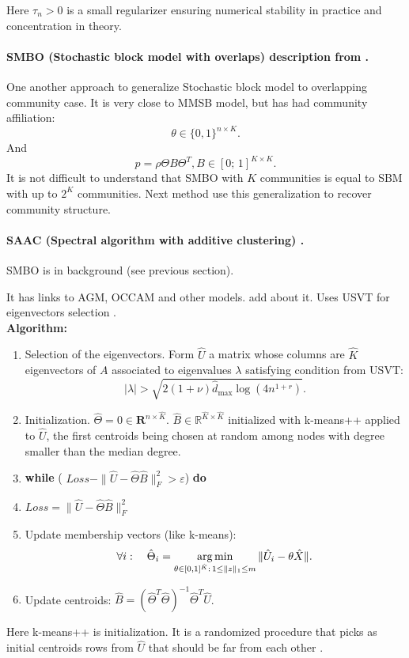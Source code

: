 \documentclass{ITaSconf}
\newcommand{\argmin}{\mathop{\rm arg\,min}\limits}
\begin{document}
	Here $\tau_n > 0$ is a small regularizer ensuring numerical stability in practice and concentration in theory.
	
	\paragraph{SMBO (Stochastic block model with overlaps) description from  \cite{kaufmann2015SAAC}.}
	One another approach to generalize Stochastic block model to overlapping community case. It is very close to MMSB model, but has had community affiliation: 
	$$
	\theta \in \{0,1\}^{n\times K}.
	$$
	And 
	$$
	p = \rho \Theta B \Theta^T, B \in [0;\,1]^{K \times K}.
	$$
	It is not difficult to understand that SMBO with $K$ communities is equal to SBM \cite{holland1983SBM} with up to $2^K$ communities.
	Next method use this generalization to recover community structure.
	
	\paragraph{SAAC (Spectral algorithm with additive clustering) \cite{kaufmann2015SAAC}.}
	SMBO is in background (see previous section).
	
	It has links to AGM, OCCAM and other models. {\color{red} add about it.} Uses USVT for eigenvectors selection \cite{chatterjee2015matrix}. \\
	
	\textbf{Algorithm:}
	\begin{enumerate}
		\item Selection of the eigenvectors. Form $\hat U$ a matrix whose columns are $\hat K$ eigenvectors of $A$ associated to eigenvalues $\lambda$ satisfying condition from USVT:
		$$
		|\lambda| > \sqrt{2(1+\nu) \hat d_{\max} \log(4n^{1+r})}.
		$$
		\item Initialization. $\hat \Theta = 0 \in \mathbf{R}^{n \times \hat K}$. $\hat B \in \mathbb{R}^{\hat K \times \hat K}$ initialized with k-means++ applied to $\hat U$, the first centroids being chosen at random	among nodes with degree smaller than the median degree.
		\item \textbf{while} ( $Loss - \|\hat U - \hat \Theta \hat B\|^2_F > \varepsilon$) \textbf{do}
		\item \qquad $Loss = \|\hat U - \hat \Theta \hat B\|^2_F$
		\item \qquad Update membership vectors (like k-means): $$\forall i:\quad \hat \Theta_i = \argmin_{\theta \in [0,1]^{\hat K}:\,1\le\|z\|_1\le m} \| \hat{U}_i - \theta \hat X\|.$$
		\item \qquad Update centroids: $\hat B = (\hat \Theta^T \hat \Theta)^{-1} \hat \Theta ^T \hat U$.
	\end{enumerate}
	Here k-means++ is initialization. It is a randomized procedure that picks as initial
	centroids rows from $\hat U$ that should be far from each other \cite{arthur2007k}.
	
	
	
	
	
\end{document}
